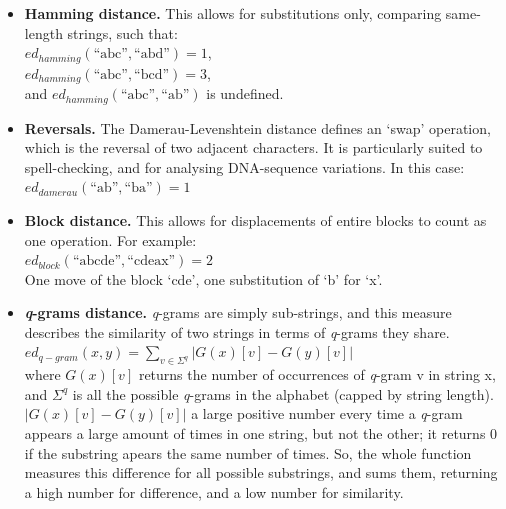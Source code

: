 \documentclass[a4paper,11pt,twoside,notitlepage]{article}
\begin{document}
        \begin{itemize}
          \item \textbf{Hamming distance.} This allows for
            substitutions only, comparing same-length strings, such
            that:\\ 
            $ed_{hamming}(\text{``abc''},\text{``abd''}) =1$,\\ 
            $ed_{hamming}(\text{``abc''},\text{``bcd''}) = 3$,\\ 
            and $ed_{hamming}(\text{``abc''},\text{``ab''})$ is
            undefined.\cite{Hamming1950}
          \item \textbf{Reversals.} The Damerau-Levenshtein distance
            defines an `swap' operation, which is the reversal of two
            adjacent characters. It is particularly suited to
            spell-checking, and for analysing DNA-sequence
            variations. In this case:\\ 
            $ed_{damerau}(\text{``ab''},\text{``ba''}) = 1$
          \item \textbf{Block distance.} This allows for displacements
            of entire blocks to count as one operation. For example:\\
            $ed_{block}(\text{``abcde''},\text{``cdeax''})= 2$ \\
            One move of the block `cde', one substitution of `b'
            for `x'.\cite{Tichy1984}
          \item \textbf{\textit{q}-grams distance.} \textit{q}-grams
            are simply sub-strings, and this measure describes the
            similarity of two strings in terms of \textit{q}-grams
            they share.\cite{Ukkonen1992}\\
            $ed_{q-gram}(x,y)=\sum\limits_{v\in\Sigma ^q}|G(x)[v]-G(y)[v]|$\\ 
            where $G(x)[v]$ returns the number of occurrences of
            \textit{q}-gram v in string x, and $\Sigma ^q$ is all the
            possible \textit{q}-grams in the
            alphabet (capped by string length). $|G(x)[v]-G(y)[v]|$ a
            large positive number every time a \textit{q}-gram appears
            a large amount of times in one string, but not the other;
            it returns 0 if the substring apears the same number of
            times. So, the whole function measures this difference for
            all possible substrings, and sums them, returning a high
            number for difference, and a low number for similarity.
        \end{itemize}
\end{document}
